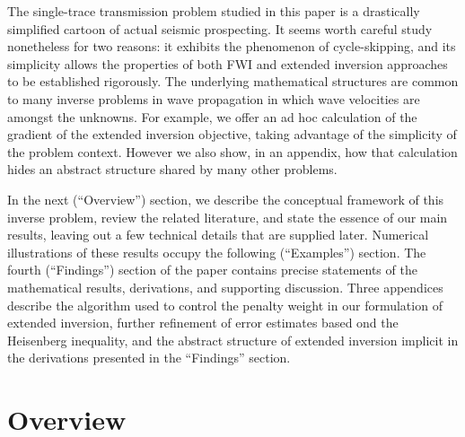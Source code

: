 The single-trace transmission problem studied in this paper is a
drastically simplified cartoon of actual seismic prospecting. It seems
worth careful study nonetheless for two reasons: it exhibits the
phenomenon of cycle-skipping, and its simplicity allows the properties
of both FWI and extended inversion approaches to be established
rigorously. The underlying mathematical structures are common to many
inverse problems in wave propagation in which wave velocities are
amongst the unknowns. For example, we offer an ad hoc calculation of
the gradient of the extended inversion objective, taking advantage of
the simplicity of the problem context. However we also show, in an
appendix, how that calculation hides an abstract structure shared by
many other problems.%

In the next (``Overview'') section, we describe the conceptual
framework of this inverse problem, review the related literature, and
state the essence of our main results, leaving out a few technical
details that are supplied later. Numerical illustrations of these
results occupy the following (``Examples'') section. The fourth
(``Findings'') section of the paper contains precise statements of the
mathematical results, derivations, and supporting discussion. Three
appendices describe the algorithm used to control the penalty weight
in our formulation of extended inversion, further refinement of error
estimates based ond the Heisenberg inequality, and the abstract
structure of extended inversion implicit in the derivations presented
in the ``Findings'' section.

\section{Overview}


